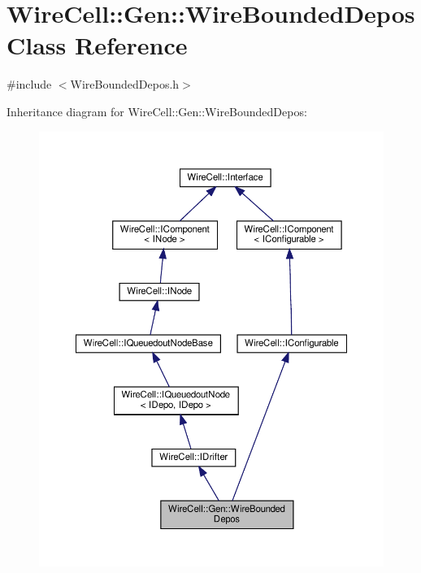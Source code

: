 \hypertarget{class_wire_cell_1_1_gen_1_1_wire_bounded_depos}{}\section{Wire\+Cell\+:\+:Gen\+:\+:Wire\+Bounded\+Depos Class Reference}
\label{class_wire_cell_1_1_gen_1_1_wire_bounded_depos}


{\ttfamily \#include $<$Wire\+Bounded\+Depos.\+h$>$}



Inheritance diagram for Wire\+Cell\+:\+:Gen\+:\+:Wire\+Bounded\+Depos\+:
\nopagebreak
\begin{figure}[H]
\begin{center}
\leavevmode
\includegraphics[width=350pt]{class_wire_cell_1_1_gen_1_1_wire_bounded_depos__inherit__graph}
\end{center}
\end{figure}


